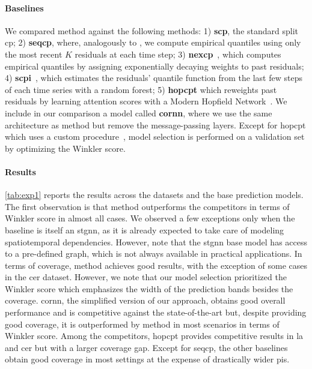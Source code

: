 \paragraph{Baselines} We compared \gls{method} against the following methods: 1) \textbf{\gls{scp}}, the standard split \gls{cp}; 2) \textbf{\gls{seqcp}}, where, analogously to \citet{xu2023conformal}, 
we compute empirical quantiles using only the most recent $K$ residuals at each time step; 3) \textbf{\gls{nexcp}}~\cite{barber2023conformal}, which computes empirical quantiles by assigning exponentially decaying weights to past residuals; 4) \textbf{\gls{scpi}}~\cite{xu2023sequential}, which estimates the residuals' quantile function from the last few steps of each time series with a random forest; 5) \textbf{\gls{hopcpt}} which reweights past residuals by learning attention scores with a Modern Hopfield
Network~\cite{ramsauer2021hopfield}. We include in our comparison a model called \textbf{\gls{cornn}}, where we use the same architecture as \gls{method} but remove the message-passing layers. 
Except for \gls{hopcpt} which uses a custom procedure~\cite{auer2023conformal}, model selection is performed on a validation set by optimizing the Winkler score. 



\paragraph{Results} \autoref{tab:exp1} reports the results across the datasets and the base prediction models. The first observation is that \gls{method} outperforms the competitors in terms of Winkler score in almost all cases. 
We observed a few exceptions only when the baseline is itself an \gls{stgnn}, as it is already expected to take care of modeling spatiotemporal dependencies. 
However, note that the \gls{stgnn} base model has access to a pre-defined graph, which is not always available in practical applications. 
In terms of coverage, \gls{method} achieves good results, with the exception of some cases in the \gls{cer} dataset. However, we note that our model selection prioritized the Winkler score which emphasizes the width of the prediction bands besides the coverage. \gls{cornn}, the simplified version of our approach, obtains good overall performance and is competitive against the state-of-the-art but, despite providing good coverage, it is outperformed by \gls{method} in most scenarios in terms of Winkler score. 
Among the competitors, \gls{hopcpt} provides competitive results in \gls{la} and \gls{cer} but with a larger coverage gap. Except for \gls{seqcp}, the other baselines obtain good coverage in most settings at the expense of drastically wider \glspl{pi}. 

